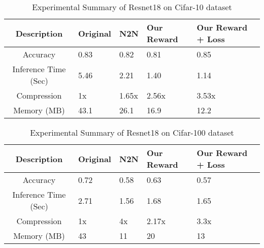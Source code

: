 \documentclass[../main]{subfiles}
\begin{document}

\begin{table*}
\caption{Experimental Summary of Resnet18 on Cifar-10 dataset}
\centering
\begin{tabular}{|c|p{1.3cm}|p{2cm}|p{1.8cm}|p{2cm}|}
 \hline
 Description & Original & N2N & Our Reward & Our Reward + Loss\\
 \hline
 Accuracy  & 0.83 & 0.82 & 0.81 & 0.85 \\
 \hline
 Inference Time (Sec) & 5.46 & 2.21 & 1.40 & 1.14 \\
 \hline
 Compression & 1x & 1.65x & 2.56x & 3.53x \\
 \hline 
 Memory (MB) & 43.1 & 26.1 & 16.9 & 12.2 \\
 \hline
\end{tabular}
\end{table*}

\begin{table*}
\caption{Experimental Summary of Resnet18 on Cifar-100 dataset}
\centering
\begin{tabular}{|c|p{1.3cm}|p{2cm}|p{1.8cm}|p{2cm}|}
 \hline
 Description & Original & N2N & Our Reward & Our Reward + Loss\\
 \hline
 Accuracy  & 0.72 & 0.58 & 0.63 & 0.57 \\
 \hline
 Inference Time (Sec) & 2.71 & 1.56 & 1.68 & 1.65 \\
 \hline
 Compression & 1x & 4x & 2.17x & 3.3x \\
 \hline 
 Memory (MB) & 43 & 11 & 20 & 13 \\
 \hline
\end{tabular}
\end{table*}
\end{document}
